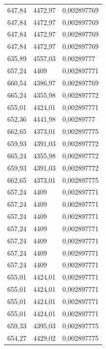 \begin{center}
\begin{longtable}{|l|l|l|}
647,84            & 4472,97           & 0,002897769 \\
647,84            & 4472,97           & 0,002897769 \\
647,84            & 4472,97           & 0,002897769 \\
647,84            & 4472,97           & 0,002897769 \\
635,89            & 4557,03           & 0,00289777  \\
657,24            & 4409              & 0,002897771 \\
660,54            & 4386,97           & 0,002897769 \\
665,24            & 4355,98           & 0,002897772 \\
655,01            & 4424,01           & 0,002897771 \\
652,36            & 4441,98           & 0,00289777  \\
662,65            & 4373,01           & 0,002897775 \\
659,93            & 4391,03           & 0,002897772 \\
665,24            & 4355,98           & 0,002897772 \\
659,93            & 4391,03           & 0,002897772 \\
662,65            & 4373,01           & 0,002897775 \\
657,24            & 4409              & 0,002897771 \\
657,24            & 4409              & 0,002897771 \\
657,24            & 4409              & 0,002897771 \\
657,24            & 4409              & 0,002897771 \\
657,24            & 4409              & 0,002897771 \\
657,24            & 4409              & 0,002897771 \\
657,24            & 4409              & 0,002897771 \\
655,01            & 4424,01           & 0,002897771 \\
655,01            & 4424,01           & 0,002897771 \\
655,01            & 4424,01           & 0,002897771 \\
655,01            & 4424,01           & 0,002897771 \\
659,33            & 4395,03           & 0,002897775 \\
654,27            & 4429,02           & 0,002897775 \\

\end{longtable}
\end{center}
